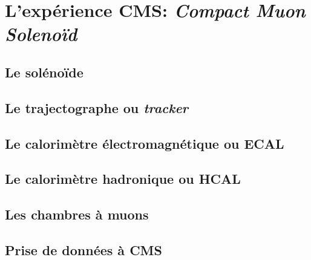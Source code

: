 \section{L'expérience CMS: \emph{Compact Muon Solenoïd}}\label{chapter-LHC-section-CMS}

\subsection{Le solénoïde}\label{chapter-LHC-section-CMS-subsec-solenoide}

\subsection{Le trajectographe ou \emph{tracker}}\label{chapter-LHC-section-CMS-subsec-tracker}

\subsection{Le calorimètre électromagnétique ou ECAL}\label{chapter-LHC-section-CMS-subsec-ECAL}

\subsection{Le calorimètre hadronique ou HCAL}\label{chapter-LHC-section-CMS-subsec-HCAL}

\subsection{Les chambres à muons}\label{chapter-LHC-section-CMS-subsec-muons}

\subsection{Prise de données à CMS}\label{chapter-LHC-section-CMS-subsec-data_taking}
